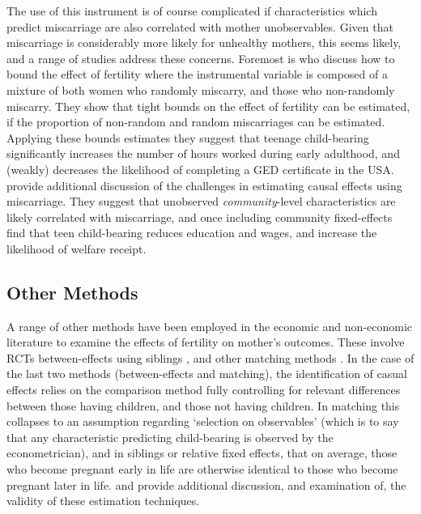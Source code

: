 The use of this instrument is of course complicated if characteristics which
predict miscarriage are also correlated with mother unobservables. Given that
miscarriage is considerably more likely for unhealthy mothers, this seems likely,
and a range of studies address these concerns.  Foremost is \citet{Hotzetal1997} 
who discuss how to bound the effect of fertility where the instrumental variable
is composed of a mixture of both women who randomly miscarry, and those who 
non-randomly miscarry.  They show that tight bounds on the effect of fertility can 
be estimated, if the proportion of non-random and random miscarriages can be
estimated.  Applying these bounds estimates they suggest that teenage child-bearing
significantly increases the number of hours worked during early adulthood, and
(weakly) decreases the likelihood of completing a GED certificate in the USA.
\citet{FletcherWolfe2009} provide additional discussion of the challenges in
estimating causal effects using miscarriage.  They suggest that unobserved
\emph{community}-level characteristics are likely correlated with miscarriage, 
and once including community fixed-effects find that teen child-bearing reduces
education and wages, and increase the likelihood of welfare receipt.


\subsection{Other Methods}
A range of other methods have been employed in the economic and non-economic
literature to examine the effects of fertility on mother's outcomes. These involve
RCTs \citep{DiCensoetal2002} between-effects using siblings \citep{Holmlund2005,
GeronimusKorenman1992,Ribar1999}, and other matching methods 
\citep{ChevalierViitanen2003,LevinePainter2003}.  In the case of the last two
methods (between-effects and matching), the identification of casual effects
relies on the comparison method fully controlling for relevant differences between
those having children, and those not having children.  In matching this collapses
to an assumption regarding `selection on observables' (which is to say that any
characteristic predicting child-bearing is observed by the econometrician), and in
siblings or relative fixed effects, that on average, those who become pregnant
early in life are otherwise identical to those who become pregnant later in life.
\citet{Ribar1999} and \citet{RosenzweigSchultz1985} provide additional discussion, 
and examination of, the validity of these estimation techniques.

